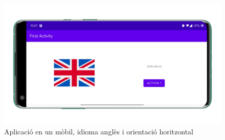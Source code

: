 \documentclass[12pt, letterpaper]{article}
\begin{document}
\begin{figure}[!htbp]
    \includegraphics[scale = 0.12]{smartphone-land.PNG}
    \centering
    \caption{Aplicació en un mòbil, idioma anglès i orientació horitzontal}
    \label{vertical}
\end{figure}
\end{document}
